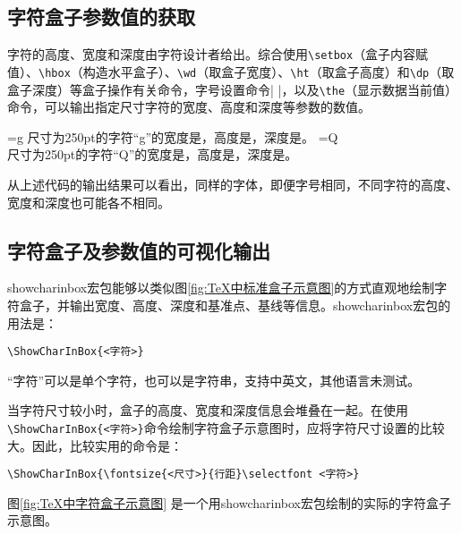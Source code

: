\documentclass{ctexart}
\newcommand{\pkg}[1]{\textsf{#1}}
\newcommand{\cmd}[1]{\texttt{\textbackslash #1}}
\begin{document}
	\subsection{字符盒子参数值的获取}
	字符的高度、宽度和深度由字符设计者给出。综合使用\cmd{setbox}（盒子内容赋值）、\cmd{hbox}（构造水平盒子）、\cmd{wd}（取盒子宽度）、\cmd{ht}（取盒子高度）和\cmd{dp}（取盒子深度）等盒子操作有关命令，字号设置命令\spverb|\fontsize{尺寸}{行距} \selectfont|，以及\cmd{the}（显示数据当前值）命令，可以输出指定尺寸字符的宽度、高度和深度等参数的数值。
	
	\begin{LTXexample}[pos = b, width = \linewidth, caption = {字符盒子高度、宽度及深度参数的获取}]
		=\hbox{\fontsize{250}{250}\selectfont g}
		尺寸为250pt的字符“g”的宽度是\the{}，高度是\the{}，深度是\the{}。
		=\hbox{\fontsize{250}{250}\selectfont Q}\\
		尺寸为250pt的字符“Q”的宽度是\the{}，高度是\the{}，深度是\the{}。
	\end{LTXexample}
	
	从上述代码的输出结果可以看出，同样的字体，即便字号相同，不同字符的高度、宽度和深度也可能各不相同。
	
	\subsection{字符盒子及参数值的可视化输出}
	\pkg{showcharinbox}宏包能够以类似图\ref{fig:TeX中标准盒子示意图}的方式直观地绘制字符盒子，并输出宽度、高度、深度和基准点、基线等信息。\pkg{showcharinbox}宏包的用法是：
	
	\verb*|\ShowCharInBox{<字符>}|
	
	“字符”可以是单个字符，也可以是字符串，支持中英文，其他语言未测试。
	
	当字符尺寸较小时，盒子的高度、宽度和深度信息会堆叠在一起。在使用\verb*|\ShowCharInBox{<字符>}|命令绘制字符盒子示意图时，应将字符尺寸设置的比较大。因此，比较实用的命令是：
	
	\verb|\ShowCharInBox{\fontsize{<尺寸>}{行距}\selectfont <字符>}|
	
	
	图\ref{fig:TeX中字符盒子示意图}
	是一个用\pkg{showcharinbox}宏包绘制的实际的字符盒子示意图。
	
\end{document}
